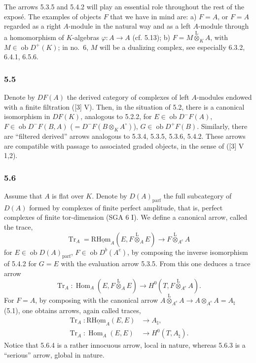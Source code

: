 \documentclass[11pt]{article}
\DeclareMathOperator{\Hom}{Hom}
\newcommand{\ob}{\operatorname{ob}}
\providecommand{\Tr}{\operatorname{Tr}}
\providecommand{\Tr}{\operatorname{Tr}}
\providecommand{\lten}{\overset{\mathrm L}{\otimes}}
\providecommand{\Tr}{\operatorname{Tr}}
\providecommand{\Hom}{\operatorname{Hom}}
\providecommand{\ob}{\operatorname{ob}}
\providecommand{\lten}{\overset{\mathrm L}{\otimes}}
\providecommand{\lten}{\overset{\mathrm L}{\otimes}}
\providecommand{\Tr}{\operatorname{Tr}}
\providecommand{\lten}{\overset{\mathrm L}{\otimes}}
\providecommand{\lten}{\overset{\mathrm L}{\otimes}}
\providecommand{\lten}{\overset{\mathrm L}{\otimes}}
\providecommand{\Hom}{\operatorname{Hom}}
\providecommand{\Tr}{\operatorname{Tr}}
\providecommand{\lten}{\overset{\mathrm L}{\otimes}}
\begin{document}
The arrows 5.3.5 and 5.4.2 will play an essential role throughout the rest of the expos\'e. The examples of objects $F$ that we have in mind are: a) $F=A$, or $F=A$ regarded as a right $A$-module in the natural way and as a left $A$-module through a homomorphism of $K$-algebras $\varphi:A\to A$ (cf. 5.13); b) $F=M\lten_KA$, with $M\in\ob D^+(K)$; in no.~6, $M$ will be a dualizing complex, see especially 6.3.2, 6.4.1, 6.5.6.

\subsubsection*{5.5}

Denote by $DF(A)$ the derived category of complexes of left $A$-modules endowed with a finite filtration ([3] V). Then, in the situation of 5.2, there is a canonical isomorphism in $DF(K)$, analogous to 5.2.2, for $E\in\ob D^-F(A)$, $F\in\ob D^-F(B,A)$ ($=D^-F(B\otimes_KA^\circ)$), $G\in\ob D^+F(B)$. Similarly, there are ``filtered derived'' arrows analogous to 5.3.4, 5.3.5, 5.3.6, 5.4.2. These arrows are compatible with passage to associated graded objects, in the sense of ([3] V 1,2).

\subsubsection*{5.6}

Assume that $A$ is flat over $K$. Denote by $D(A)_{\mathrm{parf}}$ the full subcategory of $D(A)$ formed by complexes of finite perfect amplitude, that is, perfect complexes of finite tor-dimension (SGA 6 I). We define a canonical arrow, called the trace,
\begin{equation}\tag{5.6.1}
\Tr_A=\mathrm{R}\underline{\mathrm{Hom}}_A(E,F\lten_AE)\longrightarrow F\lten_{A^e}A
\end{equation}
for $E\in\ob D(A)_{\mathrm{parf}}$, $F\in\ob D^b(A^e)$, by composing the inverse isomorphism of 5.4.2 for $G=E$ with the evaluation arrow 5.3.5. From this one deduces a trace arrow
\begin{equation}\tag{5.6.2}
\Tr_A:\Hom_A(E,F\lten_AE)\longrightarrow H^0(T,F\lten_{A^e}A).
\end{equation}
For $F=A$, by composing with the canonical arrow $A\lten_{A^e}A\to A\otimes_{A^e}A=A_\natural$ (5.1), one obtains arrows, again called traces,
\begin{align}
\Tr_A:\mathrm{R}\underline{\mathrm{Hom}}_A(E,E)&\longrightarrow A_\natural,\tag{5.6.3}\\
\Tr_A:\Hom_A(E,E)&\longrightarrow H^0(T,A_\natural).\tag{5.6.4}
\end{align}
Notice that 5.6.4 is a rather innocuous arrow, local in nature, whereas 5.6.3 is a ``serious'' arrow, global in nature.
\end{document}
